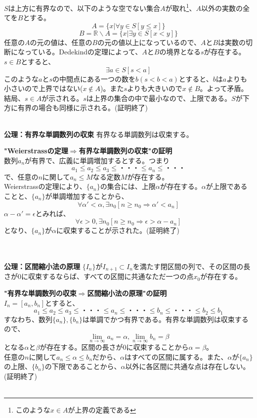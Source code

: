 \documentclass[10pt]{jarticle}
\begin{document}
$S$は上方に有界なので、以下のような空でない集合$A$が取れ\footnote{このような$x\in A$が上界の定義である}、$A$以外の実数の全てを$B$とする。
\[A=\{x|\forall y\in S [y\leq x]\}\]
\[B=\mathbb{R}\backslash A=\{x|\exists y\in S [x<y]\}\]
任意の$A$の元の値は、任意の$B$の元の値以上になっているので、$A$と$B$は実数の切断になっている。Dedekindの定理によって、$A$と$B$の境界となる$s$が存在する。\\
$s\in B$とすると、
\[\exists a\in S　[s< a]\]
このような$a$と$s$の中間点にある一つの数を$b　(s<b<a)$とすると、$b$は$a$よりも小さいので上界ではない($x\notin A$)。また$s$よりも大きいので$x\notin B$。よって矛盾。\\
結局、$s\in A$が示される。$s$は上界の集合の中で最小なので、上限である。$S$が下方に有界の場合も同様に示される。(証明終了)
\\
\\


\begin{itembox}[l]{\textbf{公理：有界な単調数列の収束}}
有界なる単調数列は収束する。
\end{itembox}
\textbf{"Weierstrassの定理$\Longrightarrow$有界な単調数列の収束"の証明}\\
数列${a_n}$が有界で、広義に単調増加するとする。つまり
\[a_1\leq a_2 \leq a_3 \leq ・・・\leq a_n \leq・・・\]
で、任意の$n$に関して$a_n\leq M$なる定数$M$が存在する。\\Weierstrassの定理により、$\{a_n\}$の集合には、上限$\alpha$が存在する。$\alpha$が上限であることと、$\{a_n\}$が単調増加することから、
\[\forall \alpha'<\alpha, \exists n_0 [n\ge n_0 \Rightarrow \alpha'<a_n]\]
$\alpha-\alpha'=\epsilon$とみれば、
\[\forall \epsilon>0, \exists n_0 [n\ge n_0 \Rightarrow \epsilon>\alpha-a_n]\]
となり、$\{a_n\}$が$\alpha$に収束することが示された。(証明終了)\\
\\
\\

\begin{itembox}[l]{\textbf{公理：区間縮小法の原理}}
$\{I_n\}$が$I_{n+1}\subset I_n$を満たす閉区間の列で、その区間の長さが0に収束するならば、すべての区間に共通なただ一つの点$x_0$が存在する。
\end{itembox}
\textbf{"有界な単調数列の収束$\Longrightarrow$区間縮小法の原理"の証明}\\
$I_n=[a_n,b_n]$とすると、
\[a_1\leq a_2 \leq a_3 \leq ・・・\leq a_n \leq ・・・\leq b_n \leq ・・・\leq b_2\leq b_1\]
すなわち、数列$\{a_n\},\{b_n\}$は単調でかつ有界である。有界な単調数列は収束するので、
\[\lim_{n\to\infty}a_n=\alpha,　\lim_{n\to\infty}b_n=\beta\]
となる$\alpha$と$\beta$が存在する。区間の長さが$0$に収束することから$\alpha=\beta$。\\
任意の$n$に関して$a_n\leq\alpha\leq b_n$だから、$\alpha$はすべての区間に属する。また、$\alpha$が$\{a_n\}$の上限、$\{b_n\}$の下限であることから、$\alpha$以外に各区間に共通な点は存在しない。(証明終了)
\\
\\
\end{document}
